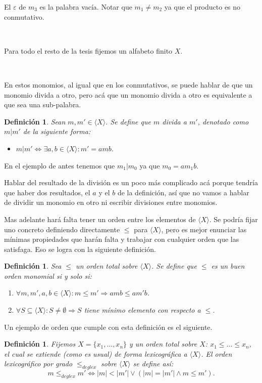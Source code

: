 \documentclass[12pt]{report}
\theoremstyle{customstyle}
\newtheorem{definition}[theorem]{Definición}
\theoremstyle{factstyle}
\begin{document}
El $ε$ de $m_3$ es la palabra vacía. Notar que $m_1 ≠ m_2$ ya que el producto es no conmutativo.

\

Para todo el resto de la tesis fijemos un alfabeto finito $X$.

\

En estos monomios, al igual que en los conmutativos, se puede hablar de que un monomio divida a otro, pero acá que un monomio divida a otro es equivalente a que sea una sub-palabra.

\begin{definition}
  Sean $m, m' ∈ ⟨X⟩$. Se define que $m$ divida a $m'$, denotado como $m | m'$ de la siguiente forma:
  \begin{itemize}
    \item $m | m' ⇔ ∃a , b ∈ ⟨X⟩ : m' = a m b$.
  \end{itemize}
\end{definition}

En el ejemplo de antes tenemos que $m_1 | m_0$ ya que $m_0 = a m_1 b$.

Hablar del resultado de la división es un poco más complicado acá porque tendría que haber dos resultados, el $a$ y el $b$ de la definición, así que no vamos a hablar de dividir un monomio en otro ni escribir divisiones entre monomios.

Mas adelante hará falta tener un orden entre los elementos de $⟨X⟩$. Se podría fijar uno concreto definiendo directamente $≤$ para $⟨X⟩$, pero es mejor enunciar las mínimas propiedades que harán falta y trabajar con cualquier orden que las satisfaga. Eso se logra con la siguiente definición.

\begin{definition}\label{def:buen orden monomial}
  Sea $≤$ un orden total sobre $⟨X⟩$. Se define que $≤$ es un buen orden monomial si y solo si:
  \begin{enumerate}
    \item $∀m, m', a, b ∈ ⟨X⟩ : m ≤ m' ⇒ a m b ≤ a m' b$.
    \item $∀S ⊆ ⟨X⟩ : S ≠ ∅ ⇒ S$ tiene mínimo elemento con respecto a $≤$.
  \end{enumerate}
\end{definition}

Un ejemplo de orden que cumple con esta definición es el siguiente.

\begin{definition}
  Fijemos $X = \{x_1, …, x_n\}$ y un orden total sobre $X$: $x_1 ≤ … ≤ x_n$, el cual se extiende (como es usual) de forma lexicográfica a $⟨X⟩$. El orden lexicográfico por grado $ ≤_{deglex}$ sobre $⟨X⟩$ se define así:
  \[ m ≤_{deglex} m' ⇔ |m| < |m'| ∨ (|m| = |m'| ∧ m ≤ m') \text{.}\]
\end{definition}
\end{document}
